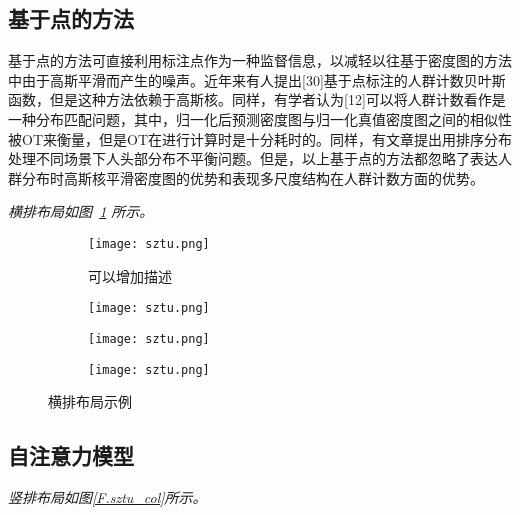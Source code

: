 \subsection{基于点的方法}

基于点的方法可直接利用标注点作为一种监督信息，以减轻以往基于密度图的方法中由于高斯平滑而产生的噪声。近年来有人提出[30]基于点标注的人群计数贝叶斯函数，但是这种方法依赖于高斯核。同样，有学者认为[12]可以将人群计数看作是一种分布匹配问题，其中，归一化后预测密度图与归一化真值密度图之间的相似性被OT来衡量，但是OT在进行计算时是十分耗时的。同样，有文章提出用排序分布处理不同场景下人头部分布不平衡问题。但是，以上基于点的方法都忽略了表达人群分布时高斯核平滑密度图的优势和表现多尺度结构在人群计数方面的优势。


\emph{横排布局如图~\ref{F.sztu_row} 所示。}

\begin{figure}[!htb]
    \centering
    \begin{subfigure}[t]{0.24\linewidth}
        \begin{minipage}[b]{1\linewidth}
        \texttt{[image: sztu.png]}
        \caption{可以增加描述}
        \end{minipage}
    \end{subfigure}
    \begin{subfigure}[t]{0.24\linewidth}
        \begin{minipage}[b]{1\linewidth}
        \texttt{[image: sztu.png]}
        \caption{}
        \end{minipage}
    \end{subfigure}
    \begin{subfigure}[t]{0.24\linewidth}
        \begin{minipage}[b]{1\linewidth}
        \texttt{[image: sztu.png]}
        \caption{}
        \end{minipage}
    \end{subfigure}
    \begin{subfigure}[t]{0.24\linewidth}
        \begin{minipage}[b]{1\linewidth}
        \texttt{[image: sztu.png]}
        \caption{}
        \end{minipage}
    \end{subfigure}
    \caption{横排布局示例}
    \label{F.sztu_row}
\end{figure}

\lipsum

\subsection{自注意力模型}
\emph{竖排布局如图\ref{F.sztu_col}所示。}

